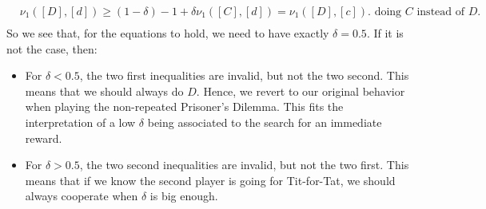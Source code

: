 \begin{example}
$$\begin{aligned}
& \nu_1([D],[d])  \geq (1-\delta) -1 + \delta \nu_1([C],[d])  = \nu_1([D],[c]). \text{ doing $C$ instead of $D$. } \\
\end{aligned}
$$
So we see that, for the equations to hold, we need to have exactly $\delta = 0.5$.
If it is not the case, then:
\begin{itemize}
\item For $\delta < 0.5$, the two first inequalities are invalid, but not the two second. This means that we should always do $D$.
Hence, we revert to our original behavior when playing the non-repeated Prisoner's Dilemma. This fits the interpretation of a low $\delta$ being associated to the search for an immediate reward.
\item For $\delta > 0.5$, the two second inequalities are invalid, but not the two first.
This means that if we know the second player is going for Tit-for-Tat, we should always cooperate when $\delta$ is big enough.
\end{itemize}



\end{example}


\ifx \globalmark \undefined %


	
\else

\fi
